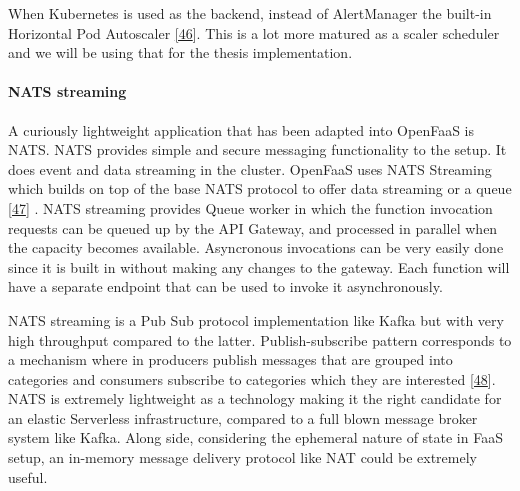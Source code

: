 \documentclass[12pt,titlepage]{article}
\begin{document}
When Kubernetes is used as the backend, instead of AlertManager the built-in
Horizontal Pod Autoscaler \hyperref[ref:46]{[46}]. This is a lot more matured as a scaler
scheduler and we will be using that for the thesis implementation.

\paragraph{NATS streaming}
\label{sec:orgf4d65aa}

A curiously lightweight application that has been adapted into OpenFaaS is NATS.
NATS provides simple and secure messaging functionality to the setup. It does
event and data streaming in the cluster. OpenFaaS uses NATS Streaming which
builds on top of the base NATS protocol to offer data streaming or a queue \hyperref[ref:47]{[47}]
. NATS streaming provides Queue worker in which the function invocation
requests can be queued up by the API Gateway, and processed in parallel when the
capacity becomes available. Asyncronous invocations can be very easily done
since it is built in without making any changes to the gateway. Each function
will have a separate endpoint that can be used to invoke it asynchronously.

NATS streaming is a Pub Sub protocol implementation like Kafka but with very
high throughput compared to the latter. Publish-subscribe  pattern  corresponds
to a mechanism where in producers publish messages that are grouped into
categories and consumers subscribe to categories which they are interested \hyperref[ref:48]{[48}]. NATS
is extremely lightweight as a
technology making it the right candidate for an elastic Serverless
infrastructure, compared to a full blown message broker
system like Kafka. Along side, considering the ephemeral nature of state in FaaS
setup, an in-memory message delivery protocol like NAT could be extremely
useful.
\end{document}
